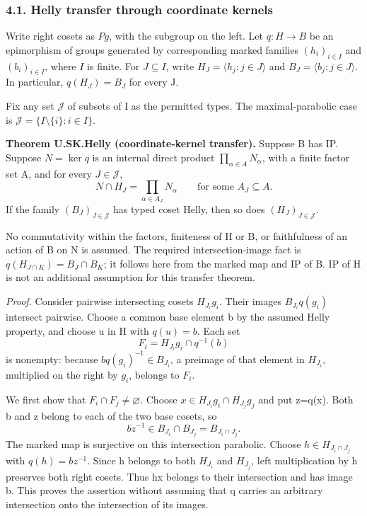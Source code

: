 \documentclass[
  11pt,
  a4paper,
]{article}
\begin{document}
\subsubsection{4.1. Helly transfer through coordinate
kernels}\label{helly-transfer-through-coordinate-kernels}

Write right cosets as \(P g\), with the subgroup on the left. Let
\(q:H\to B\) be an epimorphism of groups generated by corresponding
marked families \((h_i)_{i\in I}\) and \((b_i)_{i\in I}\), where \(I\)
is finite. For \(J\subseteq I\), write \(H_J=\langle h_j:j\in J\rangle\)
and \(B_J=\langle b_j:j\in J\rangle\). In particular, \(q(H_J)=B_J\) for
every J.

Fix any set \(\mathcal J\) of subsets of I as the permitted types. The
maximal-parabolic case is \(\mathcal J=\{I\setminus\{i\}:i\in I\}\).

\textbf{Theorem U.SK.Helly (coordinate-kernel transfer).} Suppose B has
IP. Suppose \(N=\ker q\) is an internal direct product
\(\prod_{\alpha\in A}N_\alpha\), with a finite factor set A, and for
every \(J\in\mathcal J\), \[
 N\cap H_J=\prod_{\alpha\in A_J}N_\alpha
 \qquad\text{for some }A_J\subseteq A.
 \tag{4.6}
\] If the family \((B_J)_{J\in\mathcal J}\) has typed coset Helly, then
so does \((H_J)_{J\in\mathcal J}\).

No commutativity within the factors, finiteness of H or B, or
faithfulness of an action of B on N is assumed. The required
intersection-image fact is \(q(H_{J\cap K})=B_J\cap B_K\); it follows
here from the marked map and IP of B. IP of H is not an additional
assumption for this transfer theorem.

\emph{Proof.} Consider pairwise intersecting cosets \(H_{J_i}g_i\).
Their images \(B_{J_i}q(g_i)\) intersect pairwise. Choose a common base
element b by the assumed Helly property, and choose u in H with
\(q(u)=b\). Each set \[
 F_i=H_{J_i}g_i\cap q^{-1}(b)
\] is nonempty: because \(bq(g_i)^{-1}\in B_{J_i}\), a preimage of that
element in \(H_{J_i}\), multiplied on the right by \(g_i\), belongs to
\(F_i\).

We first show that \(F_i\cap F_j\ne\varnothing\). Choose
\(x\in H_{J_i}g_i\cap H_{J_j}g_j\) and put z=q(x). Both b and z belong
to each of the two base cosets, so \[
 bz^{-1}\in B_{J_i}\cap B_{J_j}=B_{J_i\cap J_j}.
\] The marked map is surjective on this intersection parabolic. Choose
\(h\in H_{J_i\cap J_j}\) with \(q(h)=bz^{-1}\). Since h belongs to both
\(H_{J_i}\) and \(H_{J_j}\), left multiplication by h preserves both
right cosets. Thus hx belongs to their intersection and has image b.
This proves the assertion without assuming that q carries an arbitrary
intersection onto the intersection of its images.
\end{document}
